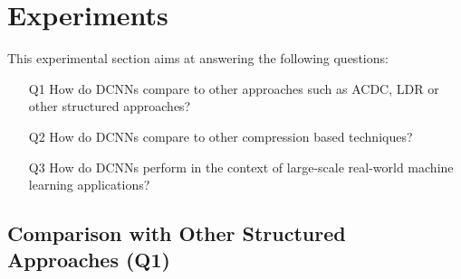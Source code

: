 \section{Experiments}
\label{section:ch4-experiments}

This experimental section aims at answering the following questions:
\begin{enumerate}
    \itshape
    \item[Q1] How do DCNNs compare to other approaches such as ACDC, LDR or other structured approaches?
    \item[Q2] How do DCNNs compare to other compression based techniques?
    \item[Q3] How do DCNNs perform in the context of large-scale real-world machine learning applications?  
\end{enumerate}


\subsection{Comparison with Other Structured Approaches (Q1)}
\label{subsection:ch4-comparison_with_other_structured_approches}




